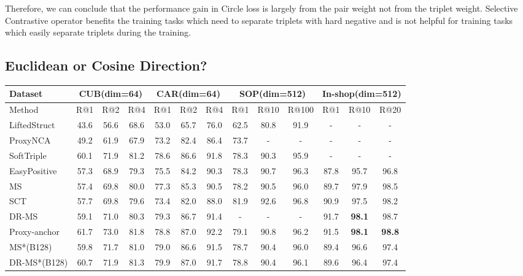 \documentclass[10pt,twocolumn,letterpaper]{article}
\begin{document}
Therefore, we can conclude that the performance gain in Circle loss is largely from the pair weight not from the triplet weight. Selective Contrastive operator benefits the training tasks which need to separate triplets with hard negative and is not helpful for training tasks which easily separate triplets during the training. 



\subsection{Euclidean or Cosine Direction?}
\label{sec:euc_cos}
\begin{table*}[t]
\centering
\begin{adjustbox}{width=1.0\textwidth}
\begin{tabular}{l|ccc|ccc|ccc|ccc}
Dataset & \multicolumn{3}{c}{CUB(dim=64)} & \multicolumn{3}{c}{CAR(dim=64)} & \multicolumn{3}{c}{SOP(dim=512)} & \multicolumn{3}{c}{In-shop(dim=512)} \\
\hline
Method & R@1 & R@2 & R@4 & R@1 & R@2 & R@4 & R@1 & R@10 & R@100 & R@1 & R@10 & R@20 \\
\hline
LiftedStruct~\cite{SOP} 
& 43.6 & 56.6 & 68.6 & 53.0 & 65.7 & 76.0 & 62.5 & 80.8 & 91.9 & - & - & - \\
ProxyNCA~\cite{Proxy} 
& 49.2 & 61.9 & 67.9 & 73.2 & 82.4 & 86.4 & 73.7 & - & - & - & - & - \\
SoftTriple~\cite{Qian_2019_ICCV} 
& 60.1 & 71.9 & 81.2 & 78.6 & 86.6 & 91.8 & 78.3 & 90.3 & 95.9 & - & - & - \\
EasyPositive~\cite{Xuan_2020_WACV} 
& 57.3 & 68.9 & 79.3 & 75.5 & 84.2 & 90.3 & 78.3 & 90.7 & 96.3 & 87.8 & 95.7 & 96.8 \\
MS~\cite{wang2019multi} 
& 57.4 & 69.8 & 80.0 & 77.3 & 85.3 & 90.5 & 78.2 & 90.5 & 96.0 & 89.7 & 97.9 & 98.5 \\
SCT~\cite{Xuan_2020_ECCV}
& 57.7 & 69.8 & 79.6 & 73.4 & 82.0 & 88.0 & 81.9 & 92.6 & 96.8 & 90.9 & 97.5 & 98.2 \\
DR-MS~\cite{Mohan_2020_CVPR} 
& 59.1 & 71.0 & 80.3 & 79.3 & 86.7 & 91.4 & - & - & - & 91.7 & \bf{98.1} & 98.7 \\
Proxy-anchor~\cite{Kim_2020_CVPR} & 61.7 & 73.0 & 81.8 & 78.8 & 87.0 & 92.2 & 79.1 & 90.8 & 96.2 & 91.5 & \bf{98.1} & \bf{98.8} \\
\hline
MS*(B128)
& 59.8 & 71.7 & 81.0 & 79.0 & 86.6 & 91.5 & 78.7 & 90.4 & 96.0 & 89.4 & 96.6 & 97.4 \\
DR-MS*(B128)
& 60.7 & 71.9 & 81.3 & 79.9 & 87.0 & 91.7 & 78.8 & 90.4 & 96.1 & 89.6 & 96.4 & 97.4\\

\end{tabular}
\end{adjustbox}
\end{table*}
\end{document}
